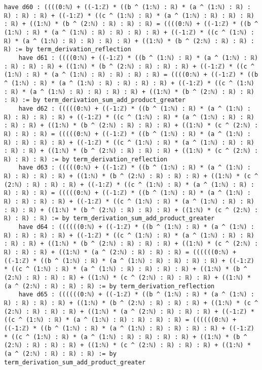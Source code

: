 \documentclass{article}
\begin{document}
\begin{tcolorbox}[colback=white!10, width=\linewidth]
\begin{lstlisting}[language=Lean4]
    have d60 : ((((0:ℕ) + ((-1:ℤ) * ((b ^ (1:ℕ) : ℝ) * (a ^ (1:ℕ) : ℝ) : ℝ) : ℝ) : ℝ) + ((-1:ℤ) * ((c ^ (1:ℕ) : ℝ) * (a ^ (1:ℕ) : ℝ) : ℝ) : ℝ) : ℝ) + ((1:ℕ) * (b ^ (2:ℕ) : ℝ) : ℝ) : ℝ) = ((((0:ℕ) + ((-1:ℤ) * ((b ^ (1:ℕ) : ℝ) * (a ^ (1:ℕ) : ℝ) : ℝ) : ℝ) : ℝ) + ((-1:ℤ) * ((c ^ (1:ℕ) : ℝ) * (a ^ (1:ℕ) : ℝ) : ℝ) : ℝ) : ℝ) + ((1:ℕ) * (b ^ (2:ℕ) : ℝ) : ℝ) : ℝ) := by term_derivation_reflection
    have d61 : ((((0:ℕ) + ((-1:ℤ) * ((b ^ (1:ℕ) : ℝ) * (a ^ (1:ℕ) : ℝ) : ℝ) : ℝ) : ℝ) + ((1:ℕ) * (b ^ (2:ℕ) : ℝ) : ℝ) : ℝ) + ((-1:ℤ) * ((c ^ (1:ℕ) : ℝ) * (a ^ (1:ℕ) : ℝ) : ℝ) : ℝ) : ℝ) = ((((0:ℕ) + ((-1:ℤ) * ((b ^ (1:ℕ) : ℝ) * (a ^ (1:ℕ) : ℝ) : ℝ) : ℝ) : ℝ) + ((-1:ℤ) * ((c ^ (1:ℕ) : ℝ) * (a ^ (1:ℕ) : ℝ) : ℝ) : ℝ) : ℝ) + ((1:ℕ) * (b ^ (2:ℕ) : ℝ) : ℝ) : ℝ) := by term_derivation_sum_add_product_greater
    have d62 : (((((0:ℕ) + ((-1:ℤ) * ((b ^ (1:ℕ) : ℝ) * (a ^ (1:ℕ) : ℝ) : ℝ) : ℝ) : ℝ) + ((-1:ℤ) * ((c ^ (1:ℕ) : ℝ) * (a ^ (1:ℕ) : ℝ) : ℝ) : ℝ) : ℝ) + ((1:ℕ) * (b ^ (2:ℕ) : ℝ) : ℝ) : ℝ) + ((1:ℕ) * (c ^ (2:ℕ) : ℝ) : ℝ) : ℝ) = (((((0:ℕ) + ((-1:ℤ) * ((b ^ (1:ℕ) : ℝ) * (a ^ (1:ℕ) : ℝ) : ℝ) : ℝ) : ℝ) + ((-1:ℤ) * ((c ^ (1:ℕ) : ℝ) * (a ^ (1:ℕ) : ℝ) : ℝ) : ℝ) : ℝ) + ((1:ℕ) * (b ^ (2:ℕ) : ℝ) : ℝ) : ℝ) + ((1:ℕ) * (c ^ (2:ℕ) : ℝ) : ℝ) : ℝ) := by term_derivation_reflection
    have d63 : (((((0:ℕ) + ((-1:ℤ) * ((b ^ (1:ℕ) : ℝ) * (a ^ (1:ℕ) : ℝ) : ℝ) : ℝ) : ℝ) + ((1:ℕ) * (b ^ (2:ℕ) : ℝ) : ℝ) : ℝ) + ((1:ℕ) * (c ^ (2:ℕ) : ℝ) : ℝ) : ℝ) + ((-1:ℤ) * ((c ^ (1:ℕ) : ℝ) * (a ^ (1:ℕ) : ℝ) : ℝ) : ℝ) : ℝ) = (((((0:ℕ) + ((-1:ℤ) * ((b ^ (1:ℕ) : ℝ) * (a ^ (1:ℕ) : ℝ) : ℝ) : ℝ) : ℝ) + ((-1:ℤ) * ((c ^ (1:ℕ) : ℝ) * (a ^ (1:ℕ) : ℝ) : ℝ) : ℝ) : ℝ) + ((1:ℕ) * (b ^ (2:ℕ) : ℝ) : ℝ) : ℝ) + ((1:ℕ) * (c ^ (2:ℕ) : ℝ) : ℝ) : ℝ) := by term_derivation_sum_add_product_greater
    have d64 : ((((((0:ℕ) + ((-1:ℤ) * ((b ^ (1:ℕ) : ℝ) * (a ^ (1:ℕ) : ℝ) : ℝ) : ℝ) : ℝ) + ((-1:ℤ) * ((c ^ (1:ℕ) : ℝ) * (a ^ (1:ℕ) : ℝ) : ℝ) : ℝ) : ℝ) + ((1:ℕ) * (b ^ (2:ℕ) : ℝ) : ℝ) : ℝ) + ((1:ℕ) * (c ^ (2:ℕ) : ℝ) : ℝ) : ℝ) + ((1:ℕ) * (a ^ (2:ℕ) : ℝ) : ℝ) : ℝ) = ((((((0:ℕ) + ((-1:ℤ) * ((b ^ (1:ℕ) : ℝ) * (a ^ (1:ℕ) : ℝ) : ℝ) : ℝ) : ℝ) + ((-1:ℤ) * ((c ^ (1:ℕ) : ℝ) * (a ^ (1:ℕ) : ℝ) : ℝ) : ℝ) : ℝ) + ((1:ℕ) * (b ^ (2:ℕ) : ℝ) : ℝ) : ℝ) + ((1:ℕ) * (c ^ (2:ℕ) : ℝ) : ℝ) : ℝ) + ((1:ℕ) * (a ^ (2:ℕ) : ℝ) : ℝ) : ℝ) := by term_derivation_reflection
    have d65 : ((((((0:ℕ) + ((-1:ℤ) * ((b ^ (1:ℕ) : ℝ) * (a ^ (1:ℕ) : ℝ) : ℝ) : ℝ) : ℝ) + ((1:ℕ) * (b ^ (2:ℕ) : ℝ) : ℝ) : ℝ) + ((1:ℕ) * (c ^ (2:ℕ) : ℝ) : ℝ) : ℝ) + ((1:ℕ) * (a ^ (2:ℕ) : ℝ) : ℝ) : ℝ) + ((-1:ℤ) * ((c ^ (1:ℕ) : ℝ) * (a ^ (1:ℕ) : ℝ) : ℝ) : ℝ) : ℝ) = ((((((0:ℕ) + ((-1:ℤ) * ((b ^ (1:ℕ) : ℝ) * (a ^ (1:ℕ) : ℝ) : ℝ) : ℝ) : ℝ) + ((-1:ℤ) * ((c ^ (1:ℕ) : ℝ) * (a ^ (1:ℕ) : ℝ) : ℝ) : ℝ) : ℝ) + ((1:ℕ) * (b ^ (2:ℕ) : ℝ) : ℝ) : ℝ) + ((1:ℕ) * (c ^ (2:ℕ) : ℝ) : ℝ) : ℝ) + ((1:ℕ) * (a ^ (2:ℕ) : ℝ) : ℝ) : ℝ) := by term_derivation_sum_add_product_greater

\end{lstlisting}
\end{tcolorbox}
\end{document}
